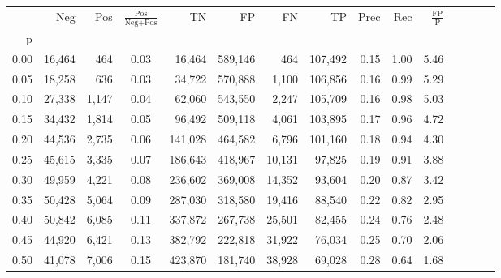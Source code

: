 \begin{tabular}{rrrcrrrrrrrrrrr}
\toprule
{} &     Neg &    Pos & $\frac{\text{Pos}}{\text{Neg}+\text{Pos}}$ &       TN &       FP &       FN &       TP &  Prec &   Rec & $\frac{\text{FP}}{\text{P}}$ \\
p    &         &        &                                            &          &          &          &          &       &       &                              \\
\midrule
0.00 &  16,464 &    464 &                                       0.03 &   16,464 &  589,146 &      464 &  107,492 &  0.15 &  1.00 &                         5.46 \\
0.05 &  18,258 &    636 &                                       0.03 &   34,722 &  570,888 &    1,100 &  106,856 &  0.16 &  0.99 &                         5.29 \\
0.10 &  27,338 &  1,147 &                                       0.04 &   62,060 &  543,550 &    2,247 &  105,709 &  0.16 &  0.98 &                         5.03 \\
0.15 &  34,432 &  1,814 &                                       0.05 &   96,492 &  509,118 &    4,061 &  103,895 &  0.17 &  0.96 &                         4.72 \\
0.20 &  44,536 &  2,735 &                                       0.06 &  141,028 &  464,582 &    6,796 &  101,160 &  0.18 &  0.94 &                         4.30 \\
0.25 &  45,615 &  3,335 &                                       0.07 &  186,643 &  418,967 &   10,131 &   97,825 &  0.19 &  0.91 &                         3.88 \\
0.30 &  49,959 &  4,221 &                                       0.08 &  236,602 &  369,008 &   14,352 &   93,604 &  0.20 &  0.87 &                         3.42 \\
0.35 &  50,428 &  5,064 &                                       0.09 &  287,030 &  318,580 &   19,416 &   88,540 &  0.22 &  0.82 &                         2.95 \\
0.40 &  50,842 &  6,085 &                                       0.11 &  337,872 &  267,738 &   25,501 &   82,455 &  0.24 &  0.76 &                         2.48 \\
0.45 &  44,920 &  6,421 &                                       0.13 &  382,792 &  222,818 &   31,922 &   76,034 &  0.25 &  0.70 &                         2.06 \\
0.50 &  41,078 &  7,006 &                                       0.15 &  423,870 &  181,740 &   38,928 &   69,028 &  0.28 &  0.64 &                         1.68 \\

\end{tabular}
